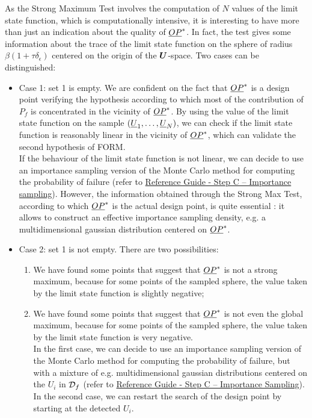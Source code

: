 As the Strong Maximum Test involves the computation of $N$ values of the limit state function, which is computationally intensive, it is interesting to have more than just an indication about the quality of ${\underline{OP}}^*$. In fact, the test gives some information about the trace of the limit state function on the sphere of radius $\beta(1+\tau \delta_{\epsilon})$ centered on the origin of the ${\boldsymbol{U}}$-space. Two cases can be distinguished:
\begin{itemize}
\item Case 1: set 1 is empty. We are confident on the fact that ${\underline{OP}}^*$ is a design point verifying the hypothesis according to which most of the contribution of $P_f$ is concentrated in the vicinity of ${\underline{OP}}^*$. By using the value of the limit state function on the sample $({\underline{U}}_1, \dots, {\underline{U}}_N)$, we can check if the limit state function is reasonably linear in the vicinity of ${\underline{OP}}^*$, which can validate the second hypothesis of FORM. \\
  If the behaviour of the limit state function is not linear, we can decide to use an importance sampling version of the Monte Carlo method for computing the probability of failure (refer to \href{OpenTURNS_ReferenceGuide.pdf}{Reference Guide - Step C -- Importance sampling}). However, the information obtained through the Strong Max Test, according to which ${\underline{OP}}^*$ is the actual design point, is quite essential : it allows to construct an effective importance sampling density, e.g. a multidimensional gaussian distribution centered on ${\underline{OP}}^*$.
\item Case 2:   set 1 is not empty. There are two possibilities:
  \begin{enumerate}
  \item We have found some points that suggest that ${\underline{OP}}^*$ is not a strong maximum, because for some points of the sampled sphere, the value taken by the limit state function is slightly negative;
  \item We have found some points that suggest that ${\underline{OP}}^*$ is not even the global maximum, because for some points of the sampled sphere, the value taken by the limit state function is very negative.\\
    In the first case, we can decide to use an importance sampling version of the Monte Carlo method for computing the probability of failure, but with a mixture of e.g. multidimensional gaussian distributions centered on the $U_i$ in ${\mathcal D}_f$ (refer to  \href{OpenTURNS_ReferenceGuide.pdf}{Reference Guide - Step C -- Importance Sampling}).
    In the second case, we can restart the search of the design point by starting at the detected $U_i$.
  \end{enumerate}
\end{itemize}



